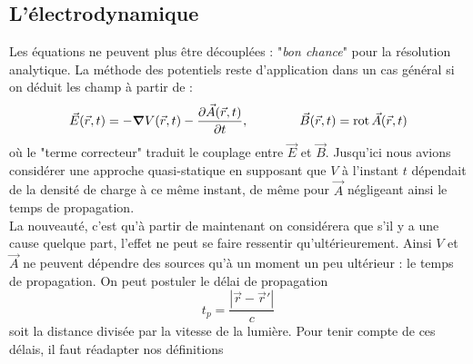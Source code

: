 \subsection{L'électrodynamique}
Les équations ne peuvent plus être découplées : "\textit{bon chance}" pour la résolution 
analytique. La méthode des potentiels reste d'application dans un cas général si on déduit 
les champ à partir de :
\begin{equation}
\vec{E}(\vec{r},t) = -\grad V(\vec{r},t)-\dfrac{\partial\vec{A}(\vec{r},t)}{\partial t},\qquad\qquad
\vec{B}(\vec{r},t) = \rot \vec{A}(\vec{r},t)
\end{equation}
où le "terme correcteur" traduit le couplage entre $\vec{E}$ et $\vec{B}$. Jusqu'ici nous 
avions considérer une approche quasi-statique en supposant que $V$ à l'instant 
$t$ dépendait de la densité de charge à ce même instant, de même pour $\vec{A}$ négligeant 
ainsi le temps de propagation.\\

La nouveauté, c'est qu'à partir de maintenant on considérera que s'il y a une cause quelque 
part, l'effet ne peut se faire ressentir qu'ultérieurement. Ainsi $V$ et $\vec{A}$ ne peuvent 
dépendre des sources qu'à un moment un peu ultérieur : le temps de propagation. On peut 
postuler le délai de propagation
\begin{equation}
t_p = \dfrac{|\vec{r}-\vec{r}'|}{c}
\end{equation}
soit la distance divisée par la vitesse de la lumière. Pour tenir compte de ces délais, 
il faut réadapter nos définitions \\

